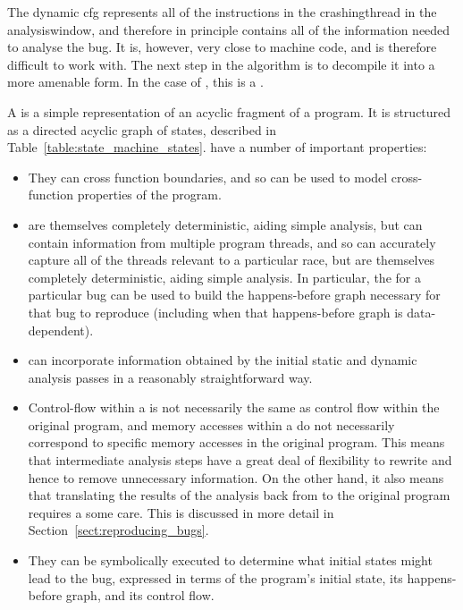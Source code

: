 The dynamic \gls{cfg} represents all of the instructions in the
\gls{crashingthread} in the \gls{analysiswindow}, and therefore in
principle contains all of the information needed to analyse the bug.
It is, however, very close to machine code, and is therefore difficult
to work with.  The next step in the algorithm is to decompile it into
a more amenable form.  In the case of {\technique}, this is a
{\StateMachine}.

A {\StateMachine} is a simple representation of an acyclic fragment of
a program.  It is structured as a directed acyclic graph of states,
described in Table~\ref{table:state_machine_states}.  {\StateMachines}
have a number of important properties:

\begin{itemize}
\item
  They can cross function boundaries, and so can be used to model
  cross-function properties of the program.
\item
  {\STateMachines} are themselves completely deterministic, aiding
  simple analysis, but can contain information from multiple program
  threads, and so can accurately capture all of the threads relevant
  to a particular race, but are themselves completely deterministic,
  aiding simple analysis.  In particular, the {\StateMachine} for a
  particular bug can be used to build the happens-before graph
  necessary for that bug to reproduce (including when that
  happens-before graph is data-dependent).
\item
  {\STateMachines} can incorporate information obtained by the initial
  static and dynamic analysis passes in a reasonably straightforward
  way.
\item
  Control-flow within a {\StateMachine} is not necessarily the same as
  control flow within the original program, and memory accesses within
  a {\StateMachine} do not necessarily correspond to specific memory
  accesses in the original program.  This means that intermediate
  analysis steps have a great deal of flexibility to rewrite
  {\StateMachines} and hence to remove unnecessary information.  On
  the other hand, it also means that translating the results of the
  analysis back from {\StateMachines} to the original program requires
  a some care.  This is discussed in more detail in
  Section~\ref{sect:reproducing_bugs}.
\item
  They can be symbolically executed to determine what initial states
  might lead to the bug, expressed in terms of the program's initial
  state, its happens-before graph, and its control flow.

\end{itemize}

